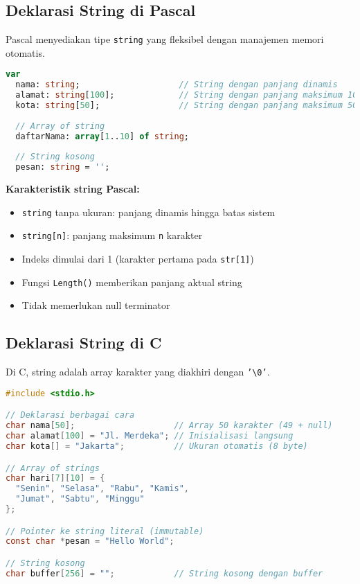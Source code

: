 \documentclass[../main.tex]{subfiles}
\begin{document}
\subsection{Deklarasi String di Pascal}

Pascal menyediakan tipe \texttt{string} yang fleksibel dengan manajemen memori otomatis.

\begin{lstlisting}[language=Pascal, caption={Deklarasi string di Pascal}]
var
  nama: string;                    // String dengan panjang dinamis
  alamat: string[100];             // String dengan panjang maksimum 100
  kota: string[50];                // String dengan panjang maksimum 50
  
  // Array of string
  daftarNama: array[1..10] of string;
  
  // String kosong
  pesan: string = '';
\end{lstlisting}

\textbf{Karakteristik string Pascal:}
\begin{itemize}
  \item \texttt{string} tanpa ukuran: panjang dinamis hingga batas sistem
  \item \texttt{string[n]}: panjang maksimum \texttt{n} karakter
  \item Indeks dimulai dari 1 (karakter pertama pada \texttt{str[1]})
  \item Fungsi \texttt{Length()} memberikan panjang aktual string
  \item Tidak memerlukan null terminator
\end{itemize}

\subsection{Deklarasi String di C}

Di C, string adalah array karakter yang diakhiri dengan \texttt{'\textbackslash 0'}.

\begin{lstlisting}[language=C, caption={Deklarasi string di C}]
#include <stdio.h>

// Deklarasi berbagai cara
char nama[50];                    // Array 50 karakter (49 + null)
char alamat[100] = "Jl. Merdeka"; // Inisialisasi langsung
char kota[] = "Jakarta";          // Ukuran otomatis (8 byte)

// Array of strings
char hari[7][10] = {
  "Senin", "Selasa", "Rabu", "Kamis",
  "Jumat", "Sabtu", "Minggu"
};

// Pointer ke string literal (immutable)
const char *pesan = "Hello World";

// String kosong
char buffer[256] = "";            // String kosong dengan buffer
\end{lstlisting}
\end{document}
